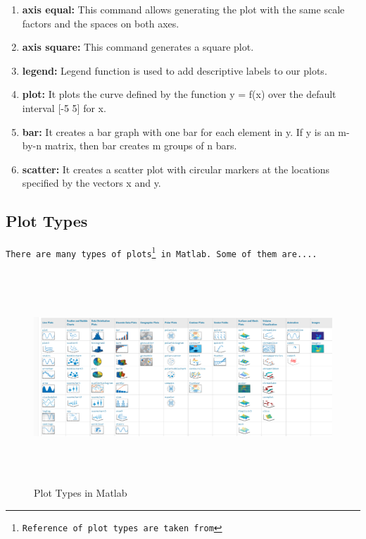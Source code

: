 \documentclass{plot-softwaremanual}
\begin{document}
\begin{enumerate}
    \item {\textbf {axis equal:}} This command allows generating the plot with the same scale factors and the spaces on both axes.
    
    \item {\textbf {axis square:}} This command generates a square plot.
    \item {\textbf {legend:}} Legend function is used to add descriptive labels to our plots.
    
    \item {\textbf{plot:}} It plots the curve defined by the function y = f(x) over the default interval [-5 5] for x.
    \item {\textbf{bar:}} It creates a bar graph with one bar for each element in y. If y is an m-by-n matrix, then bar creates m groups of n bars.
    
    \item {\textbf{scatter:}} It creates a scatter plot with circular markers at the locations specified by the vectors x and y.

  \end{enumerate}
\hspace{}
 
\subsection{Plot Types}

\vspace{\height=10}
\hspace{\height=3}

\texttt{There are many types of plots\footnote{Reference of plot types are taken from 
} in Matlab. Some of them are....}

\vspace{\height=10}
\hspace{\height=3}

\begin{figure}[hbp]
    \centering
    \includegraphics[width=15cm, height=8cm]{Images/plot-types.png}
    \caption{\label{fig:my_label}Plot Types in Matlab}
    
\end{figure}
\end{document}
